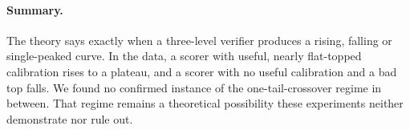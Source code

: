 \documentclass[11pt]{article}
\theoremstyle{definition}
\theoremstyle{remark}
\begin{document}
\paragraph{Summary.}
The theory says exactly when a three-level verifier produces a rising, falling or single-peaked
curve. In the data, a scorer with useful, nearly flat-topped calibration rises to a plateau, and a scorer with no useful
calibration and a bad top falls. We found no confirmed instance of the one-tail-crossover regime in between.
That regime remains a theoretical possibility these experiments neither demonstrate nor rule out.
\end{document}
